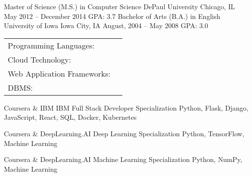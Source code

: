 \documentclass[]{awesome-cv}
\begin{document}
\begin{cventries}
	\cventry
	{Master of Science (M.S.) in Computer Science}
	{DePaul University}
	{Chicago, IL}
	{May 2012 – December 2014}
	{GPA: 3.7}
	\cventry
	{Bachelor of Arts (B.A.) in English}
	{University of Iowa}
	{Iowa City, IA}
	{August, 2004 – May 2008}
	{GPA: 3.0}
\end{cventries}

\vspace{-2mm}
\begin{cventries}
	\cventry
	{}
	{\def\arraystretch{1.15}{\begin{tabular}{ l l }
		Programming Languages:  & {\skill{ Python, JavaScript, TypeScript, C++, Scala, SQL, Java}} \\
		Cloud Technology:  & {\skill{ Docker, Kubernetes, AWS, GCP, Azure, Firebase}} \\
		Web Application Frameworks:  & {\skill{ React, Angular, Nuxt, Express.js, Flask, Django, Spring Framework}} \\
		DBMS:  & {\skill{ MySQL, PostgreSQL, Microsoft SQL Server, MongoDB, SQLite}} \\
		\end{tabular}}}
	{}
	{}
	{}
\end{cventries}

\vspace{-7mm}
\begin{cventries}
	\cventry
	{Coursera \& IBM}
	{IBM Full Stack Developer Specialization}
	{Python, Flask, Django, JavaScript, React, SQL, Docker, Kubernetes}
	{}
	{}
	
	\vspace{-5mm}
	\cventry
	{Coursera \& DeepLearning.AI}
	{Deep Learning Specialization}
	{Python, TensorFlow, Machine Learning}
	{}
	{}
	
	\vspace{-5mm}
	\cventry
	{Coursera \& DeepLearning.AI}
	{Machine Learning Specialization}
	{Python, NumPy, Machine Learning}
	{}
	{}
	
	\vspace{-5mm}
\end{cventries}

\ 
\end{document}
